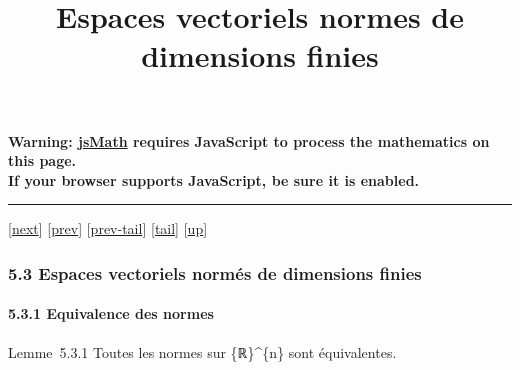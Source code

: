 \documentclass[]{article}
\title{Espaces vectoriels normes de dimensions finies}
\author{}
\date{}
\begin{document}
\maketitle

\textbf{Warning: \href{http://www.math.union.edu/locate/jsMath}{jsMath}
requires JavaScript to process the mathematics on this page.\\ If your
browser supports JavaScript, be sure it is enabled.}

\begin{center}\rule{3in}{0.4pt}\end{center}

{[}\href{coursse30.html}{next}{]} {[}\href{coursse28.html}{prev}{]}
{[}\href{coursse28.html\#tailcoursse28.html}{prev-tail}{]}
{[}\hyperref[tailcoursse29.html]{tail}{]}
{[}\href{coursch6.html\#coursse29.html}{up}{]}

\subsubsection{5.3 Espaces vectoriels normés de dimensions finies}

\paragraph{5.3.1 Equivalence des normes}

Lemme~5.3.1 Toutes les normes sur \{ℝ\}\^{}\{n\} sont équivalentes.
\end{document}
